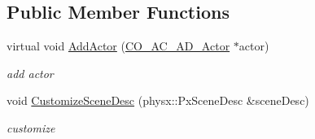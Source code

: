 \subsection*{Public Member Functions}
\begin{DoxyCompactItemize}
\item 
\hypertarget{classContent_1_1Scene_1_1Physics_1_1PhysX_1_1Scene_a81e2f5f249e600998a21a856f4348002}{
virtual void \hyperlink{classContent_1_1Scene_1_1Physics_1_1PhysX_1_1Scene_a81e2f5f249e600998a21a856f4348002}{AddActor} (\hyperlink{classContent_1_1Actor_1_1Admin_1_1Actor}{CO\_\-AC\_\-AD\_\-Actor} $\ast$actor)}
\label{classContent_1_1Scene_1_1Physics_1_1PhysX_1_1Scene_a81e2f5f249e600998a21a856f4348002}

\begin{DoxyCompactList}\small\item\em add actor \item\end{DoxyCompactList}\item 
\hypertarget{classContent_1_1Scene_1_1Physics_1_1PhysX_1_1Scene_ad78e249addc6c79b70f5440ed8dc0eaf}{
void \hyperlink{classContent_1_1Scene_1_1Physics_1_1PhysX_1_1Scene_ad78e249addc6c79b70f5440ed8dc0eaf}{CustomizeSceneDesc} (physx::PxSceneDesc \&sceneDesc)}
\label{classContent_1_1Scene_1_1Physics_1_1PhysX_1_1Scene_ad78e249addc6c79b70f5440ed8dc0eaf}

\begin{DoxyCompactList}\small\item\em customize \item\end{DoxyCompactList}\end{DoxyCompactItemize}
